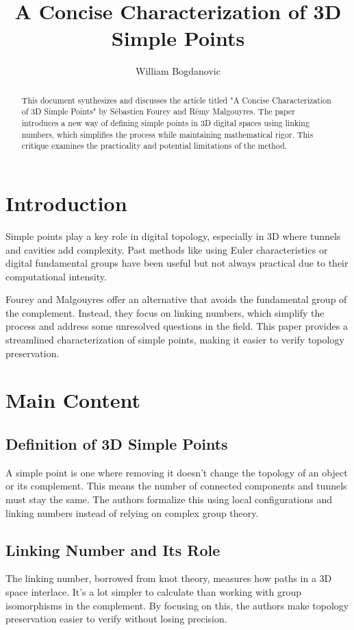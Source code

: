 \documentclass{llncs}
\begin{document}
\title{A Concise Characterization of 3D Simple Points}
\author{William Bogdanovic}
\maketitle

\begin{abstract}
This document synthesizes and discusses the article titled "A Concise Characterization of 3D Simple Points" by Sébastien Fourey and Rémy Malgouyres. The paper introduces a new way of defining simple points in 3D digital spaces using linking numbers, which simplifies the process while maintaining mathematical rigor. This critique examines the practicality and potential limitations of the method.
\end{abstract}

\section{Introduction}
Simple points play a key role in digital topology, especially in 3D where tunnels and cavities add complexity. Past methods like using Euler characteristics or digital fundamental groups have been useful but not always practical due to their computational intensity.

Fourey and Malgouyres offer an alternative that avoids the fundamental group of the complement. Instead, they focus on linking numbers, which simplify the process and address some unresolved questions in the field. This paper provides a streamlined characterization of simple points, making it easier to verify topology preservation.

\section{Main Content}
\subsection{Definition of 3D Simple Points}
A simple point is one where removing it doesn’t change the topology of an object or its complement. This means the number of connected components and tunnels must stay the same. The authors formalize this using local configurations and linking numbers instead of relying on complex group theory.

\subsection{Linking Number and Its Role}
The linking number, borrowed from knot theory, measures how paths in a 3D space interlace. It’s a lot simpler to calculate than working with group isomorphisms in the complement. By focusing on this, the authors make topology preservation easier to verify without losing precision.
\end{document}
